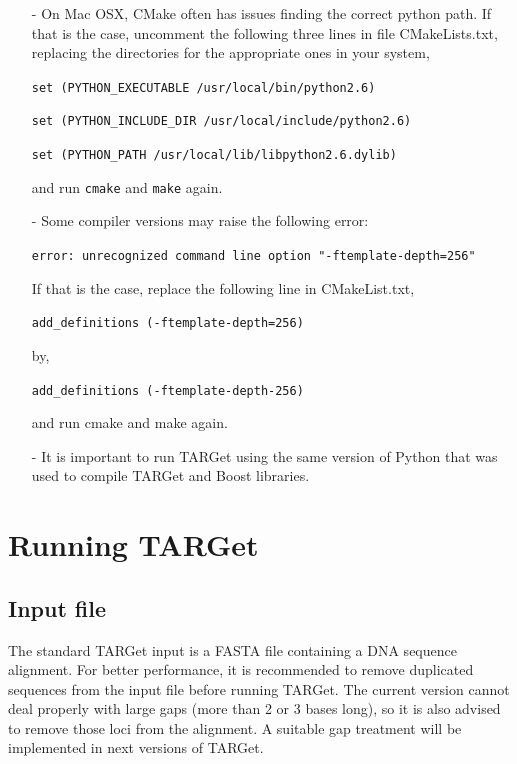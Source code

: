 \documentclass[12pt]{article}
\begin{document}
\begin{itemize}
\item[-] On Mac OSX, CMake often has issues finding the correct python path. 
If that is the case, uncomment the following three lines in file 
CMakeLists.txt, replacing the directories for the appropriate ones 
in your system,

\texttt{set (PYTHON\_EXECUTABLE /usr/local/bin/python2.6)}

\texttt{set (PYTHON\_INCLUDE\_DIR /usr/local/include/python2.6)}

\texttt{set (PYTHON\_PATH /usr/local/lib/libpython2.6.dylib)}

and run \texttt{cmake} and \texttt{make} again.

\item[-] Some compiler versions may raise the following error:

\texttt{error: unrecognized command line option "-ftemplate-depth=256"}

If that is the case, replace the following line in CMakeList.txt,

\texttt{add\_definitions  \qquad \qquad              (-ftemplate-depth=256)}

by,

\texttt{add\_definitions   \qquad \qquad          (-ftemplate-depth-256)}

and run cmake and make again.

\item[-] It is important to run TARGet using the same version of Python that 
was used to compile TARGet and Boost libraries.

\end{itemize}

\section{Running TARGet}

\subsection*{Input file}

The standard TARGet input is a FASTA file containing a DNA sequence alignment. For better performance, it is recommended to remove duplicated sequences from the input file before running TARGet. The current version cannot deal properly with large gaps (more than 2 or 3 bases long), so it is also advised to remove those loci from the alignment. A suitable gap treatment will be implemented in next versions of TARGet.
\end{document}
